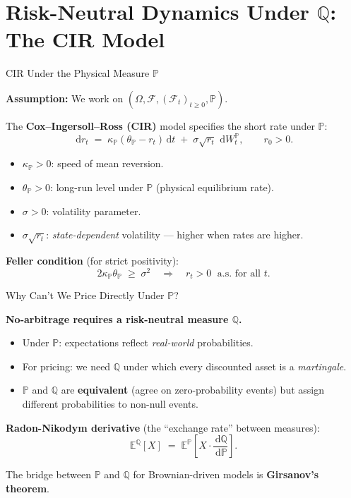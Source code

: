\documentclass[compress]{beamer}
\newcommand{\PP}{\mathbb{P}}
\newcommand{\QQ}{\mathbb{Q}}
\newcommand{\EE}{\mathbb{E}}
\newcommand{\FF}{\mathcal{F}}
\newcommand{\dd}{\,\mathrm{d}}
\begin{document}
\section{Risk-Neutral Dynamics Under $\QQ$: The CIR Model}

\begin{frame}{CIR Under the Physical Measure $\PP$}

\textbf{Assumption:} We work on $(\Omega, \FF, (\FF_t)_{t\ge 0}, \PP)$.

\medskip
The \textbf{Cox--Ingersoll--Ross (CIR)} model specifies the short rate under $\PP$:
\[
	\dd r_t \;=\; \kappa_\PP\!\left(\theta_\PP - r_t\right)\dd t \;+\; \sigma\sqrt{r_t}\,\dd W_t^\PP,
	\qquad r_0 > 0.
\]

\medskip
\begin{itemize}
	\item $\kappa_\PP > 0$: speed of mean reversion.
	\item $\theta_\PP > 0$: long-run level under $\PP$ (physical equilibrium rate).
	\item $\sigma > 0$: volatility parameter.
	\item $\sigma\sqrt{r_t}$: \textit{state-dependent} volatility — higher when rates are higher.
\end{itemize}

\medskip
\textbf{Feller condition} (for strict positivity):
\[
	2\kappa_\PP\theta_\PP \;\ge\; \sigma^2
	\quad \Rightarrow \quad r_t > 0 \;\text{ a.s.\ for all } t.
\]

\end{frame}

\begin{frame}{Why Can't We Price Directly Under $\PP$?}

\textbf{No-arbitrage requires a risk-neutral measure $\QQ$.}

\medskip
\begin{itemize}
	\item Under $\PP$: expectations reflect \textit{real-world} probabilities.
	\item For pricing: we need $\QQ$ under which every discounted asset is a \textit{martingale}.
	\item $\PP$ and $\QQ$ are \textbf{equivalent} (agree on zero-probability events) but assign different probabilities to non-null events.
\end{itemize}

\medskip
\textbf{Radon-Nikodym derivative} (the ``exchange rate'' between measures):
\[
	\EE^{\QQ}[X] \;=\; \EE^{\PP}\!\!\left[X\cdot\frac{\dd\QQ}{\dd\PP}\right].
\]

\medskip
The bridge between $\PP$ and $\QQ$ for Brownian-driven models is \textbf{Girsanov's theorem}.

\end{frame}
\end{document}
